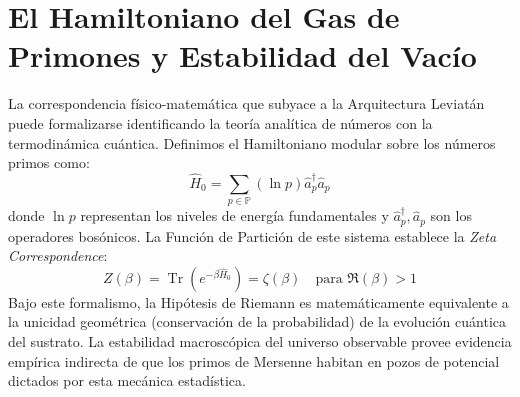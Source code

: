 \documentclass[12pt, a4paper]{article}
\theoremstyle{plain}
\theoremstyle{definition}
\theoremstyle{remark}
\begin{document}
\section{El Hamiltoniano del Gas de Primones y Estabilidad del Vacío}
\label{apendice:hamiltoniano_primones}

La correspondencia físico-matemática que subyace a la Arquitectura Leviatán puede formalizarse identificando la teoría analítica de números con la termodinámica cuántica. Definimos el Hamiltoniano modular sobre los números primos como:
\begin{equation}
    \hat{H}_0 = \sum_{p \in \mathbb{P}} (\ln p) \hat{a}_p^\dagger \hat{a}_p
\end{equation}
donde $\ln p$ representan los niveles de energía fundamentales y $\hat{a}_p^\dagger, \hat{a}_p$ son los operadores bosónicos. La Función de Partición de este sistema establece la \textit{Zeta Correspondence}:
\begin{equation}
    Z(\beta) = \operatorname{Tr}(e^{-\beta \hat{H}_0}) = \zeta(\beta) \quad \text{para } \Re(\beta) > 1
\end{equation}
Bajo este formalismo, la Hipótesis de Riemann es matemáticamente equivalente a la unicidad geométrica (conservación de la probabilidad) de la evolución cuántica del sustrato. La estabilidad macroscópica del universo observable provee evidencia empírica indirecta de que los primos de Mersenne habitan en pozos de potencial dictados por esta mecánica estadística.
\end{document}
